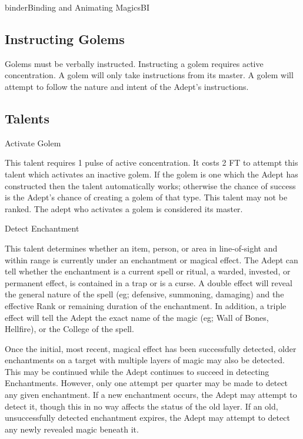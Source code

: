 \begin{college}[1.1]{binder}{Binding and Animating Magics}{BI}
\subsection{Instructing Golems}

Golems must be verbally instructed.  Instructing a golem requires
active concentration.  A golem will only take instructions from its
master.  A golem will attempt to follow the nature and intent of the
Adept's instructions.

\subsection{Talents}

\begin{talent}[T-1]{Activate Golem}

\begin{effects}
This talent requires 1 pulse of active concentration.  It costs 2 FT
to attempt this talent which activates an inactive golem.  If the
golem is one which the Adept has constructed then the talent
automatically works; otherwise the chance of success is the Adept's
chance of creating a golem of that type.  This talent may not be
ranked.  The adept who activates a golem is considered its master.
\end{effects}
\end{talent}

\begin{talent}[T-2]{Detect Enchantment}

\begin{effects}
This talent determines whether an item, person, or area in
line-of-sight and within range is currently under an enchantment or
magical effect. The Adept can tell whether the enchantment is a
current spell or ritual, a warded, invested, or permanent effect, is
contained in a trap or is a curse. A double effect will reveal the
general nature of the spell (eg; defensive, summoning, damaging) and
the effective Rank or remaining duration of the enchantment. In
addition, a triple effect will tell the Adept the exact name of the
magic (eg; Wall of Bones, Hellfire), or the College of the spell.

Once the initial, most recent, magical effect has been successfully
detected, older enchantments on a target with multiple layers of magic
may also be detected. This may be continued while the Adept continues
to succeed in detecting Enchantments. However, only one attempt per
quarter may be made to detect any given enchantment. If a new
enchantment occurs, the Adept may attempt to detect it, though this in
no way affects the status of the old layer. If an old, unsuccessfully
detected enchantment expires, the Adept may attempt to detect any
newly revealed magic beneath it.


\end{effects}
\end{talent}
\end{college}

